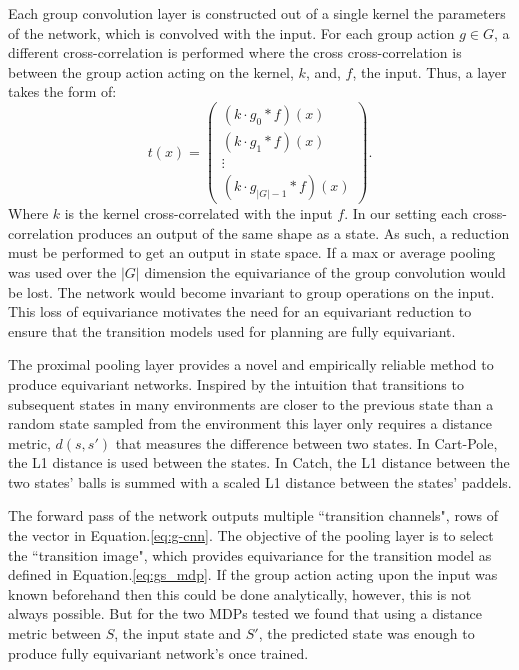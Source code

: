 \documentclass[mlabstract]{jmlr}
\begin{document}
Each group convolution layer is constructed out of a single kernel the parameters of the network, which is convolved with the input. For each group action $g \in G$, a different cross-correlation is performed where the cross cross-correlation is between the group action acting on the kernel, $k$, and, $f$, the input. Thus, a layer takes the form of:
\begin{equation}
	t(x) = \begin{pmatrix}
		(k \cdot g_0* f )(x)  \\
		(k \cdot g_1 * f )(x) \\
		\vdots                \\
		(k \cdot g_{|G|-1} * f)(x)
	\end{pmatrix}.
	\label{eq:g-cnn}
\end{equation}
Where $k$ is the kernel cross-correlated with the input $f$. In our setting each cross-correlation produces an output of the same shape as a state. As such, a reduction must be performed to get an output in state space. If a max or average pooling was used over the $|G|$ dimension the equivariance of the group convolution would be lost. The network would become invariant to group operations on the input. This loss of equivariance motivates the need for an equivariant reduction to ensure that the transition models used for planning are fully equivariant.

The proximal pooling layer provides a novel and empirically reliable method to produce equivariant networks. Inspired by the intuition that transitions to subsequent states in many environments are closer to the previous state than a random state sampled from the environment this layer only requires a distance metric, $d(s, s')$ that measures the difference between two states. In Cart-Pole, the L1 distance is used between the states. In Catch, the L1 distance between the two states' balls is summed with a scaled L1 distance between the states' paddels.

The forward pass of the network outputs multiple ``transition channels", rows of the vector in Equation.\ref{eq:g-cnn}. The objective of the pooling layer is to select the ``transition image", which provides equivariance for the transition model as defined in Equation.\ref{eq:gs_mdp}. If the group action acting upon the input was known beforehand then this could be done analytically, however, this is not always possible. But for the two MDPs tested we found that using a distance metric between $S$, the input state and $S'$, the predicted state was enough to produce fully equivariant network's once trained.
\end{document}
